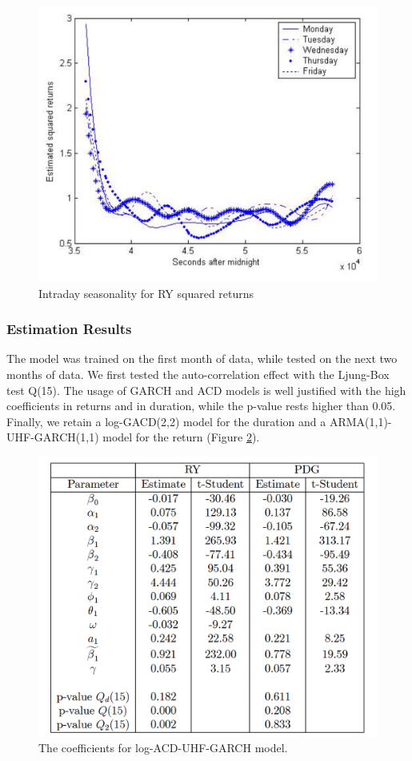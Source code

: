 \documentclass[12pt, a4paper]{article}
\begin{document}
\begin{figure}
    \centering
    \includegraphics[scale=0.3]{IntradaySeasonality.png}
    \caption{Intraday seasonality for RY squared returns}
    \label{fig:squared_returns}
\end{figure}

\subsubsection{Estimation Results}
The model was trained on the first month of data,  while tested on the next two months of data. We first tested the auto-correlation effect with the Ljung-Box test Q(15). The usage of GARCH and ACD models is well justified with the high coefficients in returns and in duration, while the p-value rests higher than 0.05. Finally, we retain a log-GACD(2,2) model for the duration and a ARMA(1,1)-UHF-GARCH(1,1) model for the return (Figure \ref{fig:IVaR_coeff}).

\begin{figure}[htpf!]
    \centering
    \includegraphics[scale=0.3]{Coefficients.png}
    \caption{The coefficients for log-ACD-UHF-GARCH model.}
    \label{fig:IVaR_coeff}
\end{figure}
\end{document}
